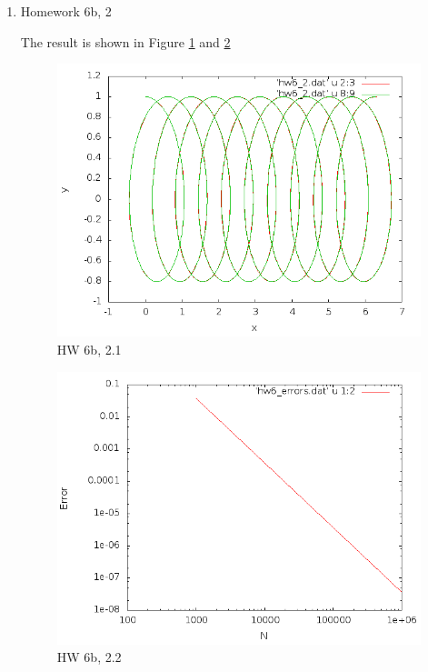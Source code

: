 \documentclass{article}
\begin{document}
\begin{enumerate}
\item Homework 6b, 2

The result is shown in Figure \ref{hw6b-2.1} and \ref{hw6b-2.2}

\begin{figure}[h]
\centering
\includegraphics[scale=0.4]{hw6b_2_1.png}
\caption{HW 6b, 2.1}
\label{hw6b-2.1}
\end{figure}

\begin{figure}[h]
\centering
\includegraphics[scale=0.4]{hw6b_2_2.png}
\caption{HW 6b, 2.2}
\label{hw6b-2.2}
\end{figure}

\end{enumerate}
\end{document}
